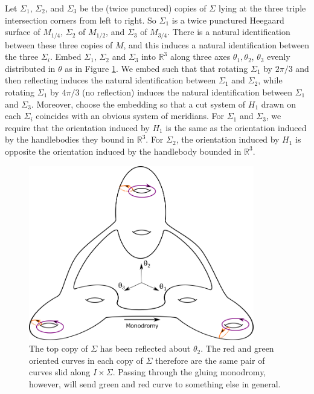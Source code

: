 \documentclass[12pt]{amsart}
\newcommand{\R}{\mathbb{R}}
\theoremstyle{definition}
\theoremstyle{remark}
\begin{document}
Let $\Sigma_1$, $\Sigma_2$, and $\Sigma_3$ be the (twice punctured) copies of $\Sigma$ lying at the three triple intersection corners from left to right.  So $\Sigma_1$ is a twice punctured Heegaard surface of $M_{1/4}$, $\Sigma_2$ of $M_{1/2}$, and $\Sigma_3$ of $M_{3/4}$.   There is a natural identification between these three copies of $M$, and this induces a natural identification between the three $\Sigma_i$.  Embed $\Sigma_1$, $\Sigma_2$ and $\Sigma_3$ into $\R^3$ along three axes $\theta_1,\theta_2$, $\theta_3$ evenly distributed in $\theta$ as in Figure \ref{embeddingsigmas}.  We embed such that that rotating $\Sigma_1$ by $2\pi/3$ and then reflecting induces the natural identification between $\Sigma_1$ and $\Sigma_2$, while rotating $\Sigma_1$ by $4\pi/3$ (no reflection) induces the natural identification between $\Sigma_1$ and $\Sigma_3$.  Moreover, choose the embedding so that a cut system of $H_1$ drawn on each $\Sigma_i$ coincides with an obvious system of meridians.  For $\Sigma_1$ and $\Sigma_3$, we require that the orientation induced by $H_1$ is the same as the orientation induced by the handlebodies they bound in $\R^3$.  For $\Sigma_2$, the orientation induced by $H_1$ is opposite the orientation induced by the handlebody bounded in $\R^3$.

\begin{figure}[h]
\centering
\includegraphics[height=3in]{sigmas.png}
\caption{  The top copy of $\Sigma$ has been reflected about $\theta_2$.  The red and green oriented curves in each copy of $\Sigma$ therefore are the same pair of curves slid along $I \times \Sigma$.  Passing through the gluing monodromy, however, will send green and red curve to something else in general.}
\label{embeddingsigmas}
\end{figure}
\end{document}
